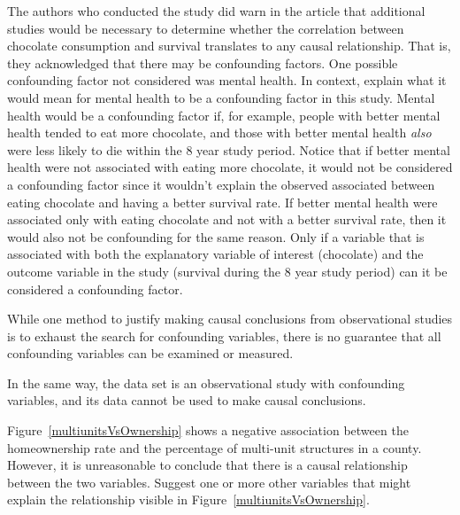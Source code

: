\begin{examplewrap}
\begin{nexample}{The authors who conducted the study did warn in the article that additional studies would be necessary to determine whether the correlation between chocolate consumption and survival translates to any causal relationship. That is, they acknowledged that there may be confounding factors. One possible confounding factor not considered was mental health. In context, explain what it would mean for mental health to be a confounding factor in this study.}
Mental health would be a confounding factor if, for example, people with better mental health tended to eat more chocolate, and those with better mental health \emph{also} were less likely to die within the 8 year study period. Notice that if better mental health were not associated with eating more chocolate, it would not be considered a confounding factor since it wouldn't explain the observed associated between eating chocolate and having a better survival rate. If better mental health were associated only with eating chocolate and not with a better survival rate, then it would also not be confounding for the same reason. Only if a variable that is associated with both the explanatory variable of interest (chocolate) and the outcome variable in the study (survival during the 8 year study period) can it be considered a confounding factor.
\end{nexample}
\end{examplewrap}

While one method to justify making causal conclusions from observational studies is to exhaust the search for confounding variables, there is no guarantee that all confounding variables can be examined or measured.

In the same way, the  data set is an observational study with confounding variables, and its data cannot be used to make causal conclusions.

\begin{exercisewrap}
\begin{nexercise}
Figure~\ref{multiunitsVsOwnership} shows a negative association between the homeownership rate and the percentage of multi-unit structures in a county. However, it is unreasonable to conclude that there is a causal relationship between the two variables. Suggest one or more other variables that might explain the relationship visible in Figure~\ref{multiunitsVsOwnership}.\footnotemark
\end{nexercise}
\end{exercisewrap}

